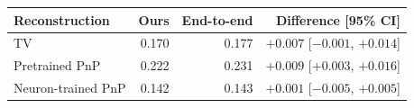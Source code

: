 \begin{tabular}{lrrr}
\toprule
Reconstruction & Ours & End-to-end & Difference [95\% CI] \\
\midrule
TV & 0.170 & 0.177 & $+0.007$ [$-0.001$, $+0.014$] \\
Pretrained PnP & 0.222 & 0.231 & $+0.009$ [$+0.003$, $+0.016$] \\
Neuron-trained PnP & 0.142 & 0.143 & $+0.001$ [$-0.005$, $+0.005$] \\
\bottomrule
\end{tabular}

